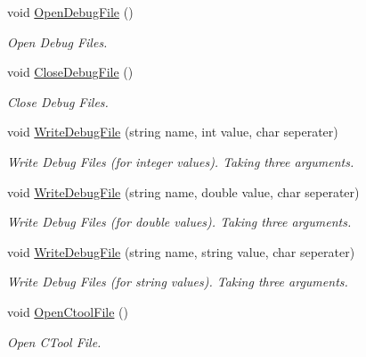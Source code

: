 \begin{DoxyCompactItemize}
\mbox{\label{class_global_vars_ae4b87d624a1c79b1cdaca50e96e2275f}} 
void \mbox{\hyperlink{class_global_vars_ae4b87d624a1c79b1cdaca50e96e2275f}{Open\+Debug\+File}} ()
\begin{DoxyCompactList}\small\item\em Open Debug Files. \end{DoxyCompactList}\item 
\mbox{\label{class_global_vars_ab2ed77b9ddaa227fa52cd7cfec57e531}} 
void \mbox{\hyperlink{class_global_vars_ab2ed77b9ddaa227fa52cd7cfec57e531}{Close\+Debug\+File}} ()
\begin{DoxyCompactList}\small\item\em Close Debug Files. \end{DoxyCompactList}\item 
void \mbox{\hyperlink{class_global_vars_a9b00f176257c6baa1223395f6aeb8856}{Write\+Debug\+File}} (string name, int value, char seperater)
\begin{DoxyCompactList}\small\item\em Write Debug Files (for integer values). Taking three arguments. \end{DoxyCompactList}\item 
void \mbox{\hyperlink{class_global_vars_a18ca1a2e643e9d3a9a265d7ca50212e0}{Write\+Debug\+File}} (string name, double value, char seperater)
\begin{DoxyCompactList}\small\item\em Write Debug Files (for double values). Taking three arguments. \end{DoxyCompactList}\item 
void \mbox{\hyperlink{class_global_vars_a3ef89864d5d06682b53941d80ad7ed36}{Write\+Debug\+File}} (string name, string value, char seperater)
\begin{DoxyCompactList}\small\item\em Write Debug Files (for string values). Taking three arguments. \end{DoxyCompactList}\item 
\mbox{\label{class_global_vars_a946e269cb4206093e882f56cbe93e266}} 
void \mbox{\hyperlink{class_global_vars_a946e269cb4206093e882f56cbe93e266}{Open\+Ctool\+File}} ()
\begin{DoxyCompactList}\small\item\em Open C\+Tool File. \end{DoxyCompactList}\item 

\end{DoxyCompactItemize}
